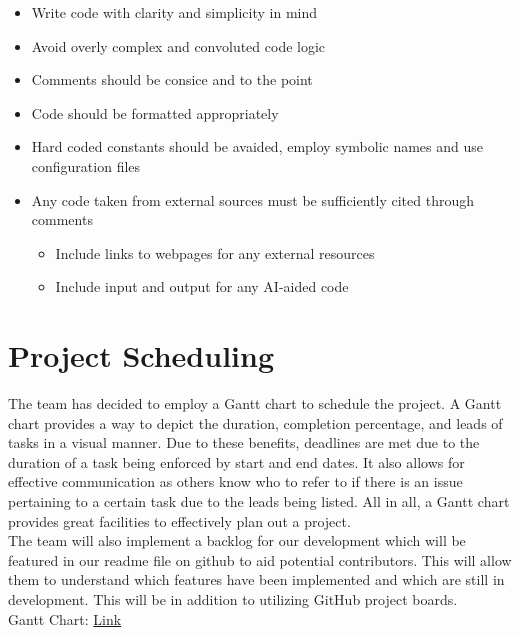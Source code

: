 \documentclass{article}
\begin{document}
\begin{itemize}
\item Write code with clarity and simplicity in mind
\item Avoid overly complex and convoluted code logic
\item Comments should be consice and to the point
\item Code should be formatted appropriately
\item Hard coded constants should be avaided, employ symbolic names and use configuration files 
\item Any code taken from external sources must be sufficiently cited through comments
\begin{itemize}
  \item Include links to webpages for any external resources
  \item Include input and output for any AI-aided code
\end{itemize}


\end{itemize}


\newpage

\section{Project Scheduling}

The team has decided to employ a Gantt chart to schedule the project. A Gantt chart provides a way to depict the duration, completion percentage, and leads of tasks in a visual manner. Due to these benefits, deadlines are met due to the duration of a task being enforced by start and end dates. It also allows for effective communication as others know who to refer to if there is an issue pertaining to a certain task due to the leads being listed. All in all, a Gantt chart provides great facilities to effectively plan out a project. \\

The team will also implement a backlog for our development which will be featured in our readme file on github to aid potential contributors. This will allow them to understand which features have been implemented and which are still in development. This will be in addition to utilizing GitHub project boards.\\

Gantt Chart: \href{https://mcmasteru365-my.sharepoint.com/:x:/g/personal/bhatth14_mcmaster_ca/ESjvjVJfZflPvcV8xfFiPxEBNGdj_fdNWy0EyGGiqIbAEw?e=9wUfQj}{Link}

\newpage{}
\end{document}
